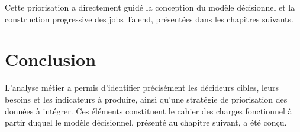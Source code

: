 Cette priorisation a directement guidé la conception du modèle décisionnel et la construction progressive des jobs Talend, présentées dans les chapitres suivants.

\section{Conclusion}
L'analyse métier a permis d'identifier précisément les décideurs cibles, leurs besoins et les indicateurs à produire, ainsi qu'une stratégie de priorisation des données à intégrer. Ces éléments constituent le cahier des charges fonctionnel à partir duquel le modèle décisionnel, présenté au chapitre suivant, a été conçu.

\clearpage
